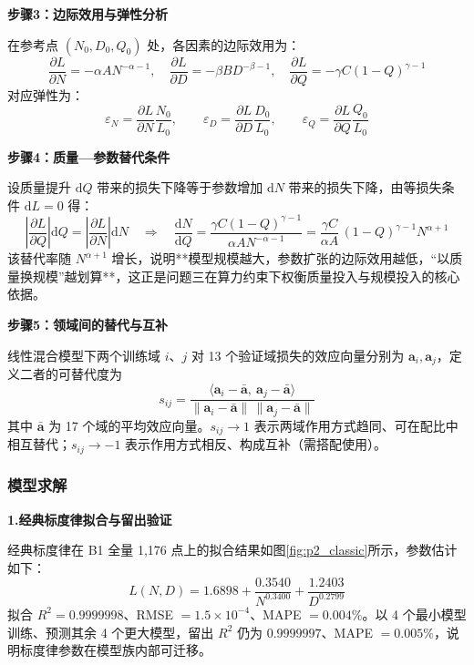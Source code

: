 \textbf{步骤3：边际效用与弹性分析}

在参考点 $(N_0,D_0,Q_0)$ 处，各因素的边际效用为：
\begin{equation}
    \frac{\partial L}{\partial N} = -\alpha A N^{-\alpha-1},\quad
    \frac{\partial L}{\partial D} = -\beta B D^{-\beta-1},\quad
    \frac{\partial L}{\partial Q} = -\gamma C (1-Q)^{\gamma-1}
\end{equation}
对应弹性为：
\begin{equation}
    \varepsilon_N = \frac{\partial L}{\partial N}\frac{N_0}{L_0},\qquad
    \varepsilon_D = \frac{\partial L}{\partial D}\frac{D_0}{L_0},\qquad
    \varepsilon_Q = \frac{\partial L}{\partial Q}\frac{Q_0}{L_0}
\end{equation}

\textbf{步骤4：质量—参数替代条件}

设质量提升 $\mathrm dQ$ 带来的损失下降等于参数增加 $\mathrm dN$ 带来的损失下降，由等损失条件 $\mathrm dL=0$ 得：
\begin{equation}
    \left|\frac{\partial L}{\partial Q}\right|\mathrm dQ = \left|\frac{\partial L}{\partial N}\right|\mathrm dN
    \quad\Longrightarrow\quad
    \frac{\mathrm dN}{\mathrm dQ} = \frac{\gamma C (1-Q)^{\gamma-1}}{\alpha A N^{-\alpha-1}}
    = \frac{\gamma C}{\alpha A}\,(1-Q)^{\gamma-1}N^{\alpha+1}
\end{equation}
该替代率随 $N^{\alpha+1}$ 增长，说明**模型规模越大，参数扩张的边际效用越低，“以质量换规模”越划算**，这正是问题三在算力约束下权衡质量投入与规模投入的核心依据。

\textbf{步骤5：领域间的替代与互补}

线性混合模型下两个训练域 $i$、$j$ 对 13 个验证域损失的效应向量分别为 $\bm a_i,\bm a_j$，定义二者的可替代度为
\begin{equation}
    s_{ij} = \frac{\langle \bm a_i-\bar{\bm a},\ \bm a_j-\bar{\bm a}\rangle}{\|\bm a_i-\bar{\bm a}\|\,\|\bm a_j-\bar{\bm a}\|}
\end{equation}
其中 $\bar{\bm a}$ 为 17 个域的平均效应向量。$s_{ij}\to1$ 表示两域作用方式趋同、可在配比中相互替代；$s_{ij}\to-1$ 表示作用方式相反、构成互补（需搭配使用）。

\subsubsection{模型求解}

\textbf{1.经典标度律拟合与留出验证}

经典标度律在 B1 全量 1{,}176 点上的拟合结果如图\ref{fig:p2_classic}所示，参数估计如下：
\begin{equation}
    L(N,D) = 1.6898 + \frac{0.3540}{N^{0.3400}} + \frac{1.2403}{D^{0.2799}}
\end{equation}
拟合 $R^2 = 0.9999998$、RMSE $=1.5\times10^{-4}$、MAPE $=0.004\%$。以 4 个最小模型训练、预测其余 4 个更大模型，留出 $R^2$ 仍为 $0.9999997$、MAPE $=0.005\%$，说明标度律参数在模型族内部可迁移。

